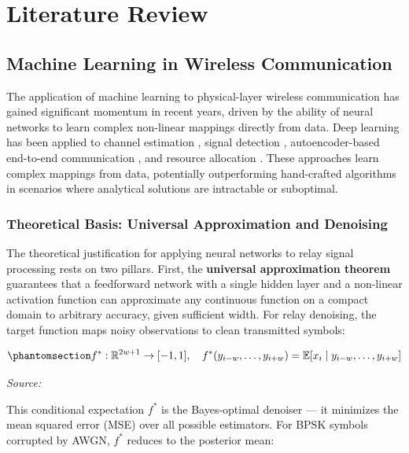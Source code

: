 \chapter{Literature Review}\label{sec:literature-review}

\section{Machine Learning in Wireless Communication}\label{sec:machine-learning-in-wireless-communication}

The application of machine learning to physical-layer wireless communication has gained significant momentum in recent years, driven by the ability of neural networks to learn complex non-linear mappings directly from data. Deep learning has been applied to channel estimation \cite{ye2018power}, signal detection \cite{samuel2019learning}, autoencoder-based end-to-end communication \cite{dorner2018deep}, and resource allocation \cite{sun2018learning}. These approaches learn complex mappings from data, potentially outperforming hand-crafted algorithms in scenarios where analytical solutions are intractable or suboptimal.

\subsection{Theoretical Basis: Universal Approximation and Denoising}\label{sec:theoretical-basis-universal-approximation-and-denoising}

The theoretical justification for applying neural networks to relay signal processing rests on two pillars. First, the \textbf{universal approximation theorem} \cite{goodfellow2016deep} guarantees that a feedforward network with a single hidden layer and a non-linear activation function can approximate any continuous function on a compact domain to arbitrary accuracy, given sufficient width. For relay denoising, the target function maps noisy observations to clean transmitted symbols:

\begin{equation}\protect\phantomsection\label{eq:optimal-denoiser}{f^*: \mathbb{R}^{2w+1} \to [-1, 1], \quad f^*(y_{i-w}, \dots, y_{i+w}) = \mathbb{E}[x_i \mid y_{i-w}, \dots, y_{i+w}]
}\end{equation}\par{\small\textit{Source: \cite{goodfellow2016deep}}}

This conditional expectation \(f^*\) is the Bayes-optimal denoiser --- it minimizes the mean squared error (MSE) over all possible estimators. For BPSK symbols corrupted by AWGN, \(f^*\) reduces to the posterior mean:

